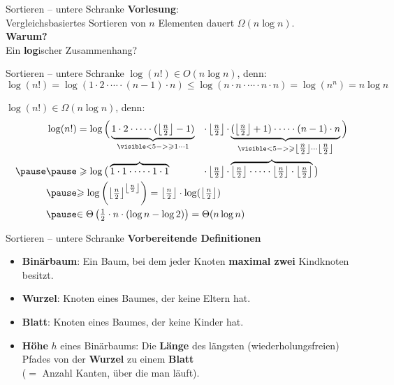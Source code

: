 \begin{frame}[t]{Sortieren – untere Schranke}
	\textbf{Vorlesung}: \\
	\quad Vergleichsbasiertes Sortieren von $n$ Elementen dauert $\Omega(n \log n)$. \\
	\pause
	\forcenewline
	\textbf{Warum?} \\
	\forcenewline
	\pause
	\impl Ein \textbf{log}ischer Zusammenhang? \\[0,125cm]
\end{frame}

\begin{frame}{Sortieren – untere Schranke}
	$\log(n!) \in O(n\log n)$, denn: 
	\pause
	\[\log(n!) = \log(1 \cdot 2 \cdot \cdots \cdot (n-1) \cdot n) \leq \log(n \cdot n \cdot \cdots \cdot n \cdot n) = \log(n^n) = n\log n \]
	\pause
	
	$\log(n!) \in \Omega(n\log n)$, denn:
	\pause
	\begin{align*}
		\log(n!) 
		&= \log \Big( 
		\underbrace{1 \cdot 2 \cdot \cdots \cdot ( 
			\floor{\tfrac{n}{2}} - 1
			)}_{\visible<5->{\geq 1 \cdots 1}}& \cdot \floor{\tfrac{n}{2}} \cdot & \underbrace{( 
			\floor{\tfrac{n}{2}} + 1
			) \cdot \cdots \cdot (n-1 ) \cdot n }_{\visible<5->{\geq \floor{\tfrac{n}{2}} \cdots \floor{\tfrac{n}{2}}}}
		\Big) \\
		\pause\pause
		&\geq \log \big( \overbrace{1 \cdot 1 \cdot \cdots \cdot 1 \cdot 1}& \cdot \floor{\tfrac{n}{2}} \cdot & \overbrace{\floor{\tfrac{n}{2}} \cdot \cdots \cdot \floor{\tfrac{n}{2}} \cdot \floor{\tfrac{n}{2}} } \big) \\
		\pause
		& \omit\rlap{$ \geq \log\left(\floor{\frac{n}{2}}^{\floor{\frac{n}{2}}}\right) = \floor{\frac{n}{2}} \cdot \log(\floor{\frac{n}{2}}) $} \\ 
		\pause
		& \omit\rlap{$ \in \Theta\left(\frac{1}{2} \cdot n \cdot (\log n - \log 2 )\right) = \Theta(n \log n) $}
	\end{align*}
\end{frame}

\begin{frame}{Sortieren – untere Schranke}
	\textbf{Vorbereitende Definitionen}
	\pause
	\begin{itemize}
		\item \textbf{Binärbaum}: Ein Baum, bei dem jeder Knoten \textbf{maximal zwei} Kindknoten besitzt. 
		\pause
		\item \textbf{Wurzel}: Knoten eines Baumes, der keine Eltern hat.
		\item \textbf{Blatt}: Knoten eines Baumes, der keine Kinder hat.
		\pause
		\item \textbf{Höhe} $h$ eines Binärbaums: Die \textbf{Länge} des längsten (wiederholungsfreien) Pfades von der \textbf{Wurzel} zu einem \textbf{Blatt} \\ {\small ($=$ Anzahl Kanten, über die man läuft)}.
	\end{itemize}
\end{frame}

